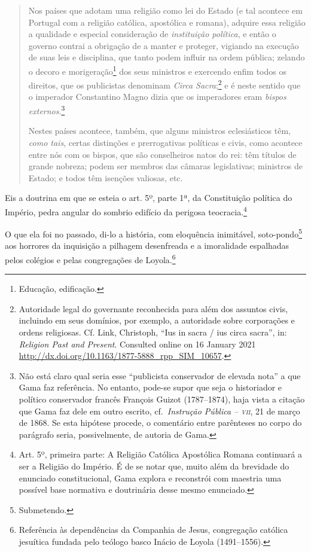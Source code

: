 \begin{quote}
Nos países que adotam uma religião como lei do Estado (e tal acontece
em Portugal com a religião católica, apostólica e romana), adquire essa
religião a qualidade e especial consideração de \emph{instituição
política}, e então o governo contrai a obrigação de a manter e proteger,
vigiando na execução de suas leis e disciplina, que tanto podem influir
na ordem pública; zelando o decoro e morigeração\footnote{Educação,
  edificação.} dos seus ministros e exercendo enfim todos os direitos,
que os publicistas denominam \emph{Circa Sacra};\footnote{Autoridade
  legal do governante reconhecida para além dos assuntos civis,
  incluindo em seus domínios, por exemplo, a autoridade sobre
  corporações e ordens religiosas. Cf. Link, Christoph, ``Ius in sacra /
  ius circa sacra'', in: \emph{Religion Past and Present}. Consulted
  online on 16 January 2021
  \url{http://dx.doi.org/10.1163/1877-5888_rpp_SIM_10657}.} e é neste
sentido que o imperador Constantino Magno dizia que os imperadores eram
\emph{bispos externos}.\footnote{Não está claro qual seria esse
  ``publicista conservador de elevada nota'' a que Gama faz referência. No
  entanto, pode-se supor que seja o historiador e político conservador
  francês François Guizot (1787--1874), haja vista a citação que Gama
  faz dele em outro escrito, cf.~\emph{Instrução Pública -- \textsc{vii}},
  21 de março de 1868. Se esta hipótese procede, o comentário entre parênteses no
  corpo do parágrafo seria, possivelmente, de autoria de Gama.}

Nestes países acontece, também, que alguns ministros eclesiásticos têm,
\emph{como tais}, certas distinções e prerrogativas políticas e civis,
como acontece entre nós com os bispos, que são conselheiros natos do
rei: têm títulos de grande nobreza; podem ser membros das câmaras
legislativas; ministros de Estado; e todos têm isenções valiosas, etc.
\end{quote}

Eis a doutrina em que se esteia o art. 5º, parte 1ª, da Constituição
política do Império, pedra angular do sombrio edifício da perigosa
teocracia.\footnote{Art. 5º, primeira parte: A Religião Católica
  Apostólica Romana continuará a ser a Religião do Império. É de se
  notar que, muito além da brevidade do enunciado constitucional, Gama
  explora e reconstrói com maestria uma possível base normativa e
  doutrinária desse mesmo enunciado.}

O que ela foi no passado, di-lo a história, com eloquência inimitável,
soto-pondo\footnote{Submetendo.} aos horrores da inquisição a pilhagem
desenfreada e a imoralidade espalhadas pelos colégios e pelas
congregações de Loyola.\footnote{Referência às dependências da
  Companhia de Jesus, congregação católica jesuítica fundada pelo
  teólogo basco Inácio de Loyola (1491--1556).}

